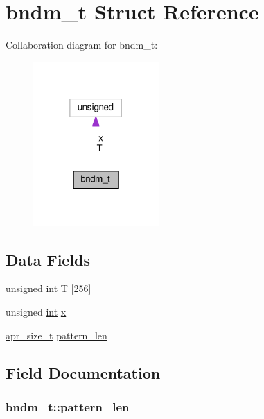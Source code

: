 \hypertarget{structbndm__t}{}\section{bndm\+\_\+t Struct Reference}
\label{structbndm__t}


Collaboration diagram for bndm\+\_\+t\+:
\nopagebreak
\begin{figure}[H]
\begin{center}
\leavevmode
\includegraphics[width=136pt]{structbndm__t__coll__graph}
\end{center}
\end{figure}
\subsection*{Data Fields}
\begin{DoxyCompactItemize}
\item 
unsigned \hyperlink{pcre_8txt_a42dfa4ff673c82d8efe7144098fbc198}{int} \hyperlink{structbndm__t_ad6e7098b82cda15268b0ec1caa1f9b39}{T} \mbox{[}256\mbox{]}
\item 
unsigned \hyperlink{pcre_8txt_a42dfa4ff673c82d8efe7144098fbc198}{int} \hyperlink{structbndm__t_a5bef6339de69199e3f1369638062fe92}{x}
\item 
\hyperlink{group__apr__platform_gaaa72b2253f6f3032cefea5712a27540e}{apr\+\_\+size\+\_\+t} \hyperlink{structbndm__t_a8b1ff7ff83cd77e62eb08338803de0bc}{pattern\+\_\+len}
\end{DoxyCompactItemize}


\subsection{Field Documentation}
\subsubsection[{\texorpdfstring{pattern\+\_\+len}{pattern_len}}]{ bndm\+\_\+t\+::pattern\+\_\+len}\hypertarget{structbndm__t_a8b1ff7ff83cd77e62eb08338803de0bc}{}\label{structbndm__t_a8b1ff7ff83cd77e62eb08338803de0bc}
